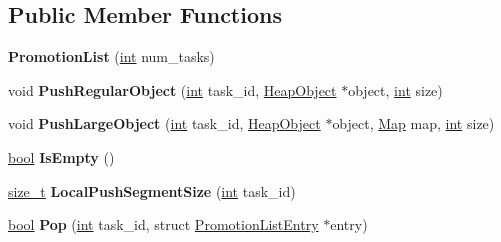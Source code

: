 \subsection*{Public Member Functions}
\begin{DoxyCompactItemize}
\item 
\mbox{\label{classv8_1_1internal_1_1Scavenger_1_1PromotionList_aac5f3d0fa3f469b301481c553dfd28c9}} 
{\bfseries Promotion\+List} (\mbox{\hyperlink{classint}{int}} num\+\_\+tasks)
\item 
\mbox{\label{classv8_1_1internal_1_1Scavenger_1_1PromotionList_a58adda6aa77cd9c08d615c54eacfe225}} 
void {\bfseries Push\+Regular\+Object} (\mbox{\hyperlink{classint}{int}} task\+\_\+id, \mbox{\hyperlink{classv8_1_1internal_1_1HeapObject}{Heap\+Object}} $\ast$object, \mbox{\hyperlink{classint}{int}} size)
\item 
\mbox{\label{classv8_1_1internal_1_1Scavenger_1_1PromotionList_a89d34156e499849c085d304e6512bd91}} 
void {\bfseries Push\+Large\+Object} (\mbox{\hyperlink{classint}{int}} task\+\_\+id, \mbox{\hyperlink{classv8_1_1internal_1_1HeapObject}{Heap\+Object}} $\ast$object, \mbox{\hyperlink{classv8_1_1internal_1_1Map}{Map}} map, \mbox{\hyperlink{classint}{int}} size)
\item 
\mbox{\label{classv8_1_1internal_1_1Scavenger_1_1PromotionList_a1419fd83828bb9de0a353c0f5112873f}} 
\mbox{\hyperlink{classbool}{bool}} {\bfseries Is\+Empty} ()
\item 
\mbox{\label{classv8_1_1internal_1_1Scavenger_1_1PromotionList_afb95ce10b129464d3f677c7f9791beb1}} 
\mbox{\hyperlink{classsize__t}{size\+\_\+t}} {\bfseries Local\+Push\+Segment\+Size} (\mbox{\hyperlink{classint}{int}} task\+\_\+id)
\item 
\mbox{\label{classv8_1_1internal_1_1Scavenger_1_1PromotionList_aa24c10a48784d1947064653597598a7d}} 
\mbox{\hyperlink{classbool}{bool}} {\bfseries Pop} (\mbox{\hyperlink{classint}{int}} task\+\_\+id, struct \mbox{\hyperlink{structv8_1_1internal_1_1Scavenger_1_1PromotionListEntry}{Promotion\+List\+Entry}} $\ast$entry)

\end{DoxyCompactItemize}
